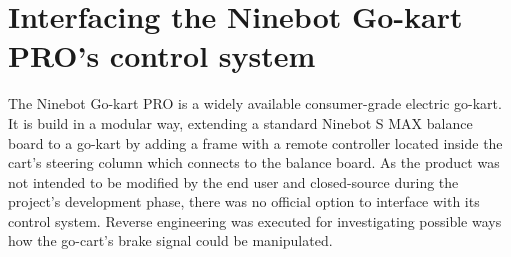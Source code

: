 \section{Interfacing the Ninebot Go-kart PRO's control system}
\label{sec:Interfacing the Ninebot Go-kart PROs control system}
The Ninebot Go-kart PRO is a widely available consumer-grade electric go-kart.
It is build in a modular way, extending a standard Ninebot S MAX balance board to a go-kart by adding a frame with a remote controller located inside the cart's steering column which connects to the balance board.
As the product was not intended to be modified by the end user and closed-source during the project's development phase, there was no official option to interface with its control system.
Reverse engineering was executed for investigating possible ways how the go-cart's brake signal could be manipulated.

